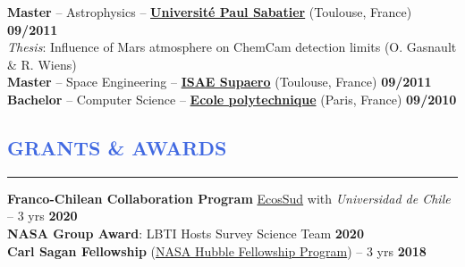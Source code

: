 \documentclass[11pt]{article}
\begin{document}
\textbf{Master} -- Astrophysics --
\href{http://ezomp2.omp.obs-mip.fr/asep/index.php/eng}{\textbf{Université Paul Sabatier}} (Toulouse, France)
\hfill  { \bf 09/2011} \\
{\small
\null \hspace{0.6cm}
{\it Thesis}: Influence of Mars atmosphere on ChemCam detection limits (O. Gasnault \& R. Wiens)}\\

\textbf{Master} -- Space Engineering -- \href{https://www.isae-supaero.fr/en/}{\textbf{\textbf{ISAE Supaero}}} (Toulouse, France) \hfill  { \bf 09/2011} \\

\textbf{Bachelor} -- Computer Science -- \href{http://www.polytechnique.edu/en/}{\textbf{\textbf{Ecole polytechnique}}} (Paris, France) \hfill    { \bf 09/2010}\\






\vspace{-0.25cm}
\textcolor{RoyalBlue}{\section{\large GRANTS \& AWARDS}
\vspace{-0.35cm}\hrule}
\vspace{0.4cm}
\textbf{Franco-Chilean Collaboration Program} \href{https://www.univ-paris13.fr/ecos-sud/}{EcosSud} with {\it Universidad de Chile} -- 3 yrs \hfill   \textbf{2020}\\ %

\vspace{-0.2cm}
\textbf{NASA Group Award}: LBTI Hosts Survey Science Team \hfill   \textbf{2020}\\ 

\vspace{-0.2cm}
\textbf{Carl Sagan Fellowship} (\href{http://www.stsci.edu/stsci-research/fellowships/nasa-hubble-fellowship-program}{NASA Hubble Fellowship Program}) -- 3 yrs \hfill   \textbf{2018}\\ %
\end{document}
